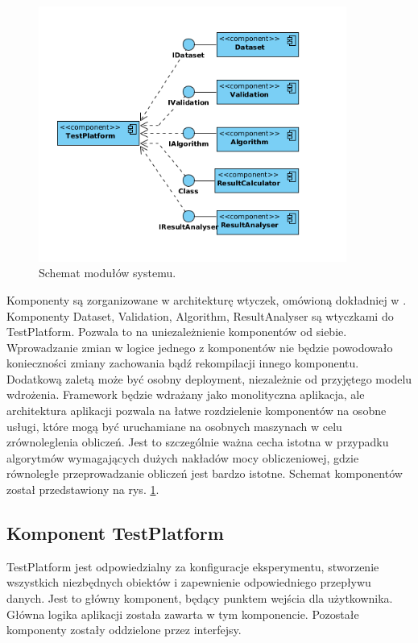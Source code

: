 \documentclass[12pt]{article}
\begin{document}
\begin{figure}
\centering
	\includegraphics[width=0.9\textwidth]{img/ModulesDiagram.png}
	\caption{Schemat modułów systemu.}
	\label{fig:modules_diagram}
\end{figure}

Komponenty są zorganizowane w architekturę wtyczek, omówioną dokładniej w \cite{clean-arch}. Komponenty Dataset, Validation, Algorithm, ResultAnalyser są wtyczkami do TestPlatform. Pozwala to na uniezależnienie komponentów od siebie. Wprowadzanie zmian w logice jednego z komponentów nie będzie powodowało konieczności zmiany zachowania bądź rekompilacji innego komponentu. Dodatkową zaletą może być osobny deployment, niezależnie od przyjętego modelu wdrożenia. Framework będzie wdrażany jako monolityczna aplikacja, ale architektura aplikacji pozwala na łatwe rozdzielenie komponentów na osobne usługi, które mogą być uruchamiane na osobnych maszynach w celu zrównoleglenia obliczeń. Jest to szczególnie ważna cecha istotna w przypadku algorytmów wymagających dużych nakładów mocy obliczeniowej, gdzie równoległe przeprowadzanie obliczeń jest bardzo istotne. Schemat komponentów został przedstawiony na rys. \ref{fig:modules_diagram}.

\subsection{Komponent TestPlatform}

TestPlatform jest odpowiedzialny za konfiguracje eksperymentu, stworzenie wszystkich niezbędnych obiektów i zapewnienie odpowiedniego przepływu danych. Jest to główny komponent, będący punktem wejścia dla użytkownika. Główna logika aplikacji została zawarta w tym komponencie. Pozostałe komponenty zostały oddzielone przez interfejsy. 
\end{document}
